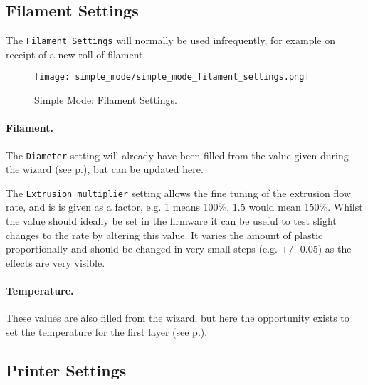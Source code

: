 \subsection{Filament Settings}

The \texttt{Filament Settings} will normally be used infrequently, for example on receipt of a new roll of filament.

\begin{figure}[H]
\centering
\texttt{[image: simple\_mode/simple\_mode\_filament\_settings.png]}
\caption{Simple Mode: Filament Settings.}
\label{fig:simple_mode_filament_settings}
\end{figure}

\paragraph{Filament.} %
\label{par:filament}
The \texttt{Diameter} setting will already have been filled from the value given during the wizard (see p.\pageref{sub:4_filament_diameter}), but can be updated here.

The \texttt{Extrusion multiplier} setting allows the fine tuning of the extrusion flow rate, and is is given as a factor, e.g. 1 means 100\%, 1.5 would mean 150\%.  Whilst the value should ideally be set in the firmware it can be useful to test slight changes to the rate by altering this value.  It varies the amount of plastic proportionally and should be changed in very small steps (e.g. +/- 0.05) as the effects are very visible.

\paragraph{Temperature.} %
\label{par:temperature}
These values are also filled from the wizard, but here the opportunity exists to set the temperature for the first layer (see p.\pageref{sec:the_important_first_layer}).


\subsection{Printer Settings}

